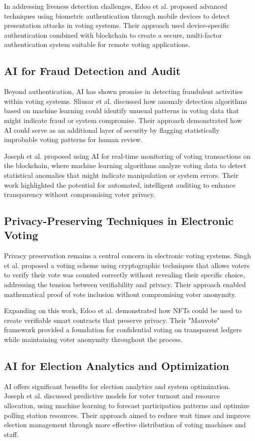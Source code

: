 \documentclass[conference]{IEEEtran}
\begin{document}
In addressing liveness detection challenges, Edoo et al. \cite{b9} proposed advanced techniques using biometric authentication through mobile devices to detect presentation attacks in voting systems. Their approach used device-specific authentication combined with blockchain to create a secure, multi-factor authentication system suitable for remote voting applications.

\subsection{AI for Fraud Detection and Audit}
Beyond authentication, AI has shown promise in detecting fraudulent activities within voting systems. Sliusar et al. \cite{b6} discussed how anomaly detection algorithms based on machine learning could identify unusual patterns in voting data that might indicate fraud or system compromise. Their approach demonstrated how AI could serve as an additional layer of security by flagging statistically improbable voting patterns for human review.

Joseph et al. \cite{b8} proposed using AI for real-time monitoring of voting transactions on the blockchain, where machine learning algorithms analyze voting data to detect statistical anomalies that might indicate manipulation or system errors. Their work highlighted the potential for automated, intelligent auditing to enhance transparency without compromising voter privacy.

\subsection{Privacy-Preserving Techniques in Electronic Voting}
Privacy preservation remains a central concern in electronic voting systems. Singh et al. \cite{b7} proposed a voting scheme using cryptographic techniques that allows voters to verify their vote was counted correctly without revealing their specific choice, addressing the tension between verifiability and privacy. Their approach enabled mathematical proof of vote inclusion without compromising voter anonymity.

Expanding on this work, Edoo et al. \cite{b9} demonstrated how NFTs could be used to create verifiable smart contracts that preserve privacy. Their "Mauvote" framework provided a foundation for confidential voting on transparent ledgers while maintaining voter anonymity throughout the process.

\subsection{AI for Election Analytics and Optimization}
AI offers significant benefits for election analytics and system optimization. Joseph et al. \cite{b8} discussed predictive models for voter turnout and resource allocation, using machine learning to forecast participation patterns and optimize polling station resources. Their approach aimed to reduce wait times and improve election management through more effective distribution of voting machines and staff.
\end{document}
